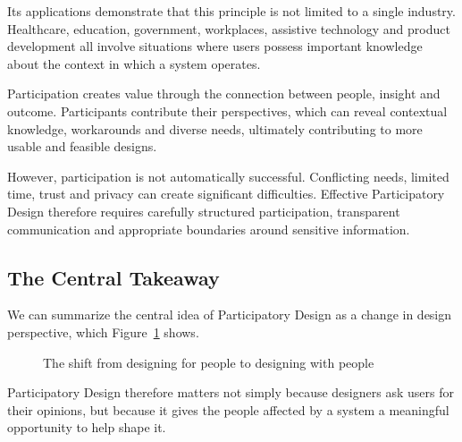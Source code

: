 \documentclass[a4paper,12pt]{article}
\begin{document}
Its applications demonstrate that this principle is not limited to a single
industry. Healthcare, education, government, workplaces, assistive
technology and product development all involve situations where users
possess important knowledge about the context in which a system operates.

Participation creates value through the connection between people, insight
and outcome. Participants contribute their perspectives, which can reveal
contextual knowledge, workarounds and diverse needs, ultimately contributing
to more usable and feasible designs.

However, participation is not automatically successful. Conflicting needs,
limited time, trust and privacy can create significant difficulties.
Effective Participatory Design therefore requires carefully structured
participation, transparent communication and appropriate boundaries around
sensitive information.



\subsection{The Central Takeaway}

We can summarize the central idea of Participatory Design as a change in
design perspective, which Figure~\ref{fig:forwith} shows.

\begin{figure}[H]
\centering
{}
\caption{The shift from designing for people to designing with people}
\label{fig:forwith}
\end{figure}

Participatory Design therefore matters not simply because designers ask users
for their opinions, but because it gives the people affected by a system a
meaningful opportunity to help shape it.



\newpage
{}

\end{document}
